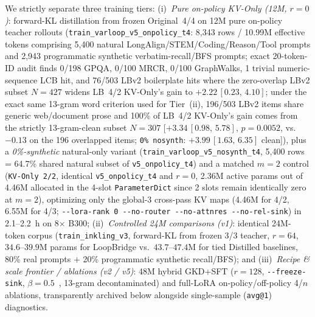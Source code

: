 \documentclass[11pt]{article}
\newcommand{\ci}[2]{\,{\scriptsize\ensuremath{[#1,\,#2]}}}
\begin{document}
We strictly separate three training tiers:
(i)~\emph{Pure on-policy KV-Only (12M, $r{=}0$)}: forward-KL distillation from frozen Original~4/4 on 12M pure on-policy
teacher rollouts (\texttt{train\_varloop\_v5\_onpolicy\_t4}: 8,343 rows / 10.99M effective tokens comprising 5,400 natural
LongAlign/STEM/Coding/Reason/Tool prompts and 2,943 programmatic synthetic verbatim-recall/BFS prompts; exact
20-token-ID audit finds 0/198 GPQA, 0/100 MRCR, 0/100 GraphWalks, 1 trivial numeric-sequence LCB hit, and 76/503 LBv2
boilerplate hits where the zero-overlap LBv2 subset $N{=}427$ widens LB~4/2 KV-Only's gain to $+2.22$\ci{0.23}{4.10};
under the exact same 13-gram word criterion used for Tier~(ii), 196/503 LBv2 items share generic web/document prose and
100\% of LB~4/2 KV-Only's gain comes from the strictly 13-gram-clean subset $N{=}307$ [$+3.34$\ci{0.98}{5.78},
$p{=}0.0052$, vs.\ $-0.13$ on the 196 overlapped items; \texttt{0\% nosynth}: $+3.99$\ci{1.63}{6.35} clean]), plus a
\emph{0\%-synthetic} natural-only variant (\texttt{train\_varloop\_v5\_nosynth\_t4}, 5,400 rows = 64.7\% shared natural
subset of \texttt{v5\_onpolicy\_t4}) and a matched $m{=}2$ control (\texttt{KV-Only~2/2}, identical
\texttt{v5\_onpolicy\_t4} and $r{=}0$, 2.36M active params out of 4.46M allocated in the 4-slot \texttt{ParameterDict}
since 2 slots remain identically zero at $m{=}2$), optimizing only the global-3 cross-pass KV maps (4.46M for 4/2, 6.55M
for 4/3; \texttt{-\/-lora-rank 0 -\/-no-router -\/-no-attnres -\/-no-rel-sink}) in 2.1--2.2~h on 8$\times$ B300;
(ii)~\emph{Controlled 24M comparisons (v1)}: identical 24M-token corpus (\texttt{train\_inkling\_v3}, forward-KL from frozen
3/3 teacher, $r{=}64$, $34.6\text{--}39.9$M params for LoopBridge vs.\ $43.7\text{--}47.4$M for tied Distilled baselines,
80\% real prompts $+$ 20\% programmatic synthetic recall/BFS); and
(iii)~\emph{Recipe \& scale frontier / ablations (v2 / v5)}: 48M hybrid GKD+SFT ($r{=}128$, \texttt{-\/-freeze-sink},
$\beta{=}0.5$~\citep{gkd}, 13-gram decontaminated) and full-LoRA on-policy/off-policy 4/$n$ ablations, transparently
archived below alongside single-sample (\texttt{avg@1}) diagnostics.
\end{document}
